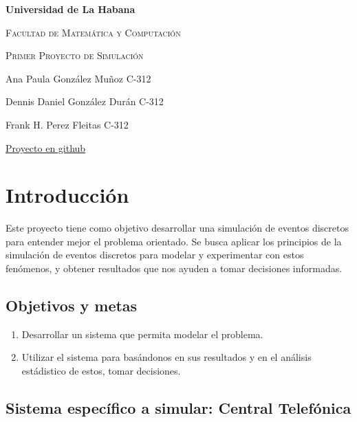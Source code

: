\documentclass{article}
\begin{document}
	
	\begin{titlepage}
		\centering
		{\bfseries\LARGE Universidad de La Habana \par}
		\vspace{1cm}
		{\scshape\Large Facultad de Matemática y Computación \par}
		\vspace{3cm}
		{\scshape\Huge Primer Proyecto de Simulación \par}
		\vfill
		
		{\Large Ana Paula González Muñoz C-312 \par}
		{\Large Dennis Daniel González Durán C-312 \par}
		{\Large Frank H. Perez Fleitas C-312 \par}
		\vfill
		{\href{https://github.com/anamunnoz/Simulation-Project}{Proyecto en github} \par}
	\end{titlepage}


	\section*{Introducción}
	Este proyecto tiene como objetivo desarrollar una simulación de eventos discretos para entender mejor el problema orientado. Se busca aplicar los principios de la simulación de eventos discretos para modelar y experimentar con estos fenómenos, y obtener resultados que nos ayuden a tomar decisiones informadas.
	
		\subsection*{Objetivos y metas}
			\begin{enumerate}
				\item  Desarrollar un sistema que permita modelar el problema.
				\item Utilizar el sistema para basándonos en sus resultados y en el análisis estádistico de estos, tomar decisiones.
			\end{enumerate}
	
		\subsection*{Sistema específico a simular: Central Telefónica}
	
\end{document}
